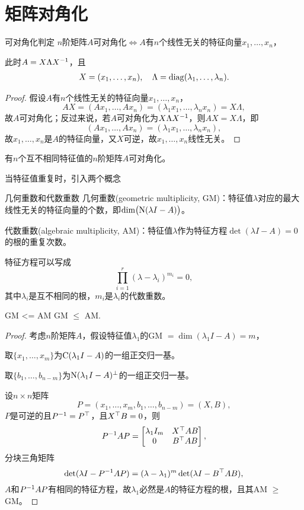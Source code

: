 \section{矩阵对角化}
\begin{theorem}{可对角化判定}{}
	$n$阶矩阵$A$可对角化$\iff A$有$n$个线性无关的特征向量$x_1,\ldots,x_n$，
	
	此时$A=X\Lambda X^{-1}$，且 
	\begin{align}
		X=(x_1,\ldots,x_n),\quad\Lambda=\operatorname{diag}(\lambda_1,\ldots,\lambda_n).
	\end{align}
\end{theorem}
\begin{proof}
	假设$A$有$n$个线性无关的特征向量$x_1,\ldots,x_n$，
	\[
		AX=(Ax_1,\ldots,Ax_n)=(\lambda_1x_1,\ldots,\lambda_nx_n)=X\Lambda,
	\]
	故$A$可对角化；反过来说，若$A$可对角化为$X\Lambda X^{-1}$，则$AX=X\Lambda$，即
	\[
		(Ax_1,\ldots,Ax_n)=(\lambda_1x_1,\ldots,\lambda_nx_n),
	\]
	故$x_1,\ldots,x_n$是$A$的特征向量，又$X$可逆，故$x_1,\ldots,x_n$线性无关。
\end{proof}
\begin{corollary}
	有$n$个互不相同特征值的$n$阶矩阵$A$可对角化。
\end{corollary}
当特征值重复时，引入两个概念
\begin{definition}{几何重数和代数重数}{}
	几何重数(geometric multiplicity, GM)：特征值$\lambda$对应的最大线性无关的特征向量的个数，即$\dim\bigl(\operatorname{N}(\lambda I-A)\bigr)$。

	代数重数(algebraic multiplicity, AM)：特征值$\lambda$作为特征方程$\det(\lambda I-A)=0$的根的重复次数。
\end{definition}
特征方程可以写成
\[
	\prod_{i=1}^r(\lambda-\lambda_i)^{m_i}=0,
\]
其中$\lambda_i$是互不相同的根，$m_i$是$\lambda_i$的代数重数。
\begin{theorem}{}{GM <= AM}
	GM $\leqslant$ AM.
\end{theorem}
\begin{proof}
	考虑$n$阶矩阵$A$，假设特征值$\lambda_1$的GM $=\dim(\lambda_1I-A)=m$，
	
	取$\{x_1,\ldots,x_m\}$为$\operatorname{C}(\lambda_1I-A)$的一组正交归一基。
	
	取$\{b_1,\ldots,b_{n-m}\}$为$\operatorname{N}(\lambda_1I-A)^\perp$的一组正交归一基。
	
	设$n\times n$矩阵 
	\[
		P=(x_1,\ldots,x_m,b_1,\ldots,b_{n-m})=(X,B),
	\]
	$P$是可逆的且$P^{-1}=P^\top$，且$X^\top B=0$，则 
	\[
		P^{-1} AP=\begin{bmatrix}
			\lambda_1I_m&X^\top AB\\0&B^\top AB
		\end{bmatrix},
	\]
	分块三角矩阵
	\[
		\det(\lambda I-P^{-1} AP)=(\lambda-\lambda_1)^m\det(\lambda I-B^\top AB),
	\]
	$A$和$P^{-1} AP$有相同的特征方程，故$\lambda_1$必然是$A$的特征方程的根，且其AM $\geqslant$ GM。
\end{proof}
